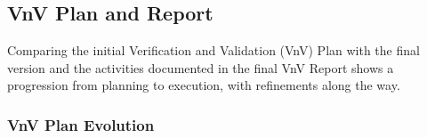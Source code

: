 \documentclass{article}
\begin{document}
\subsection{VnV Plan and Report} %

Comparing the initial Verification and Validation (VnV) Plan with the final version and the activities documented in the final VnV Report shows a progression from planning to execution, with refinements along the way.

\subsubsection{VnV Plan Evolution}
\end{document}
